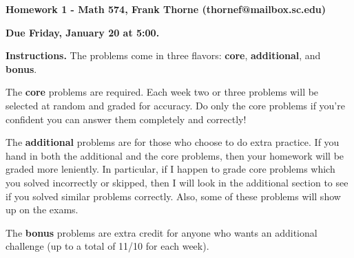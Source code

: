 \documentclass[12pt]{article}
\begin{document}
\setlength{\topmargin}{-2mm}





\begin{center}{\bf Homework 1 - Math 574, Frank Thorne (thornef@mailbox.sc.edu)}
\end{center}
\begin{center}
{\bf Due Friday, January 20 at 5:00.}
\end{center}

{\bf Instructions.} The problems come in three flavors: {\bf core}, {\bf additional},
and {\bf bonus}.

The {\bf core} problems are required. Each week two or three problems will be selected at random
and graded for accuracy. Do only the core problems if you're confident you can answer them 
completely and correctly!

The {\bf additional} problems are for those who choose to do extra practice. If you hand in
both the additional and the core problems, then your homework will be graded more leniently.
In particular,
if I happen to grade core problems which you solved incorrectly or skipped, then I will look
in the additional section to see if you solved similar problems correctly. Also, some of these
problems will show up on the exams.

The {\bf bonus} problems are extra credit for anyone who wants an additional challenge
(up to a total of 11/10 for each week). 
\end{document}
